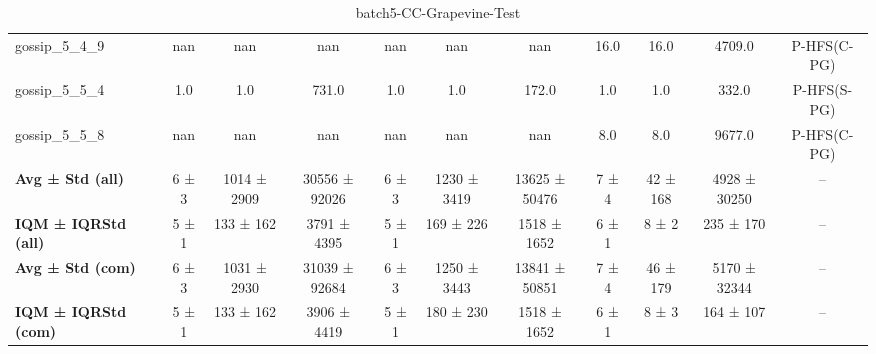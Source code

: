 \begin{table}[!ht]
\begin{tabular}{l|ccc|ccc|cccc}
gossip\_5\_4\_9 & nan & nan & nan & nan & nan & nan & 16.0 & 16.0 & 4709.0 & P-HFS(C-PG) \\
gossip\_5\_5\_4 & 1.0 & 1.0 & 731.0 & 1.0 & 1.0 & 172.0 & 1.0 & 1.0 & 332.0 & P-HFS(S-PG) \\
gossip\_5\_5\_8 & nan & nan & nan & nan & nan & nan & 8.0 & 8.0 & 9677.0 & P-HFS(C-PG) \\
\hline
\textbf{Avg ± Std (all)} & 6 ± 3 & 1014 ± 2909 & 30556 ± 92026 & 6 ± 3 & 1230 ± 3419 & 13625 ± 50476 & 7 ± 4 & 42 ± 168 & 4928 ± 30250 & -- \\
\textbf{IQM ± IQRStd (all)} & 5 ± 1 & 133 ± 162 & 3791 ± 4395 & 5 ± 1 & 169 ± 226 & 1518 ± 1652 & 6 ± 1 & 8 ± 2 & 235 ± 170 & -- \\
\textbf{Avg ± Std (com)} & 6 ± 3 & 1031 ± 2930 & 31039 ± 92684 & 6 ± 3 & 1250 ± 3443 & 13841 ± 50851 & 7 ± 4 & 46 ± 179 & 5170 ± 32344 & -- \\
\textbf{IQM ± IQRStd (com)} & 5 ± 1 & 133 ± 162 & 3906 ± 4419 & 5 ± 1 & 180 ± 230 & 1518 ± 1652 & 6 ± 1 & 8 ± 3 & 164 ± 107 & -- \\
\end{tabular}
\caption{batch5-CC-Grapevine-Test}
\label{tab:batch5_CC-Grapevine_comparison_test}
\end{table}
